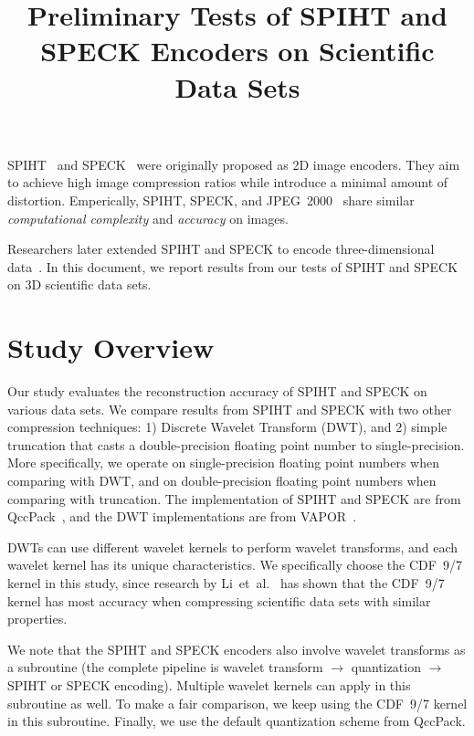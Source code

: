 \documentclass[review]{vgtc}                 %
\title{Preliminary Tests of SPIHT and SPECK Encoders on Scientific Data Sets}
\begin{document}

\maketitle

\label{sec:intro}
%
SPIHT~\cite{said1996new} and SPECK~\cite{pearlman2004efficient} 
were originally proposed as 2D image encoders.
%
They aim to achieve high image compression ratios while introduce 
a minimal amount of distortion.
%
Emperically, SPIHT, SPECK, and JPEG~2000~\cite{pearlman2004efficient}
share similar \textit{computational complexity} and \textit{accuracy}
on images.


Researchers later extended SPIHT and SPECK to encode three-dimensional
data~\cite{kim1997embedded, tang2006three}. 
%
In this document, we report results from our tests of 
SPIHT and SPECK on 3D scientific data sets.


\section{Study Overview}
%
Our study evaluates the reconstruction accuracy of SPIHT and SPECK
on various data sets. 
%
We compare results from SPIHT and SPECK with two other compression techniques:
1) Discrete Wavelet Transform (DWT), 
and 2) simple truncation that casts a double-precision
floating point number to single-precision.
%
More specifically, 
we operate on single-precision floating point numbers
when comparing with DWT, and on double-precision 
floating point numbers when comparing with truncation.
%
The implementation of SPIHT and SPECK are from QccPack~\cite{fowler2000qccpack},
and the DWT implementations are from VAPOR~\cite{clyne2007interactive}.


DWTs can use different wavelet kernels to perform wavelet transforms,
and each wavelet kernel has its unique characteristics.
%
We specifically choose the CDF~9/7 kernel in this study, since research by
Li~et~al.~\cite{li2015evaluating}
has shown that the CDF~9/7 kernel has most accuracy when compressing 
scientific data sets with similar properties.
%


We note that the SPIHT and SPECK encoders also involve wavelet transforms
as a subroutine (the complete pipeline is wavelet transform 
$\rightarrow$ quantization $\rightarrow$ SPIHT or SPECK encoding).
%
Multiple wavelet kernels can apply in this subroutine as well.
%
To make a fair comparison, we keep using the CDF~9/7 kernel in 
this subroutine.
%
Finally, we use the default quantization scheme from QccPack.
\end{document}
